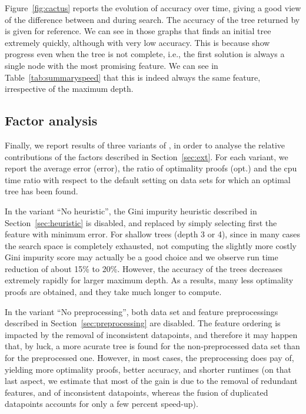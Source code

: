 \documentclass{llncs}
\begin{document}
Figure~\ref{fig:cactus} reports the evolution of accuracy over time, giving a good view of the difference between \murtree and \budalg during search. The accuracy of the tree returned by \cart is given for reference. 
We can see in those graphs that \murtree finds an initial tree extremely quickly, although with very low accuracy. This is because \murtree show progress even when the tree is not complete, i.e., the first solution is always a single node with the most promising feature. We can see in Table~\ref{tab:summaryspeed} that this is indeed always the same feature, irrespective of the maximum depth.



%
%

\subsection{Factor analysis}

Finally, we report results of three variants of \budalg, in order to analyse the relative contributions of the factors described in Section~\ref{sec:ext}. For each variant, we report the average error (error), the ratio of optimality proofs (opt.) and the cpu time ratio with respect to the default setting on data sets for which an optimal tree has been found.

In the variant ``No heuristic'', the Gini impurity heuristic described in Section~\ref{sec:heuristic} is disabled, and replaced by simply selecting first the feature with minimum error. For shallow trees (depth 3 or 4), since in many cases the search space is completely exhausted, not computing the slightly more costly Gini impurity score may actually be a good choice and we observe run time reduction of about 15\% to 20\%. However, the accuracy of the trees decreases extremely rapidly for larger maximum depth. As a results, many less optimality proofs are obtained, and they take much longer to compute.

In the variant ``No preprocessing'', both data set and feature preprocessings described in Section~\ref{sec:preprocessing} are disabled. The feature ordering is impacted by the removal of inconsistent datapoints, and therefore it may happen that, by luck, a more acurate tree is found for the non-preprocessed data set than for the preprocessed one. However, in most cases, the preprocessing does pay of, yielding more optimality proofs, better accuracy, and shorter runtimes (on that last aspect, we estimate that most of the gain is due to the removal of redundant features, and of inconsistent datapoints, whereas the fusion of duplicated datapoints accounts for only a few percent speed-up).
\end{document}

